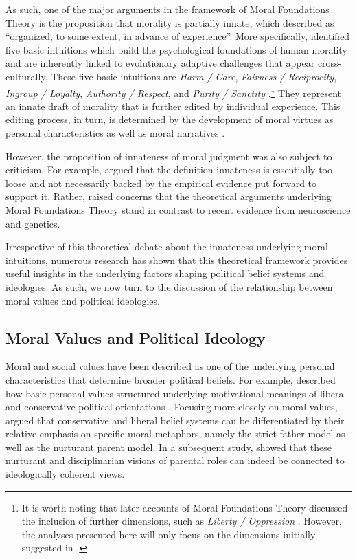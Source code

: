 \documentclass[12pt]{article}
\begin{document}
As such, one of the major arguments in the framework of Moral Foundations Theory is the proposition that morality is partially innate, which \citet[367]{haidt2008moral} described as ``organized, to some extent, in advance of experience''. More specifically, \citet{haidt2008moral} identified five basic intuitions which build the psychological foundations of human morality and are inherently linked to evolutionary adaptive challenges that appear cross-culturally. These five basic intuitions are \textit{Harm / Care}, \textit{Fairness / Reciprocity}, \textit{Ingroup / Loyalty}, \textit{Authority / Respect}, and \textit{Purity / Sanctity} \citep[see also][]{graham2011mapping}.\footnote{It is worth noting that later accounts of Moral Foundations Theory discussed the inclusion of further dimensions, such as \textit{Liberty / Oppression} \citep[c.f.][]{graham2013moral,haidt2012righteous}. However, the analyses presented here will only focus on the dimensions initially suggested in \citet{haidt2008moral}.} They represent an innate draft of morality that is further edited by individual experience. This editing process, in turn, is determined by the development of moral virtues as personal characteristics as well as moral narratives \citep{haidt2008moral}.

However, the proposition of innateness of moral judgment was also subject to criticism. For example, \citet{suhler2011can} argued that the definition innateness is essentially too loose and not necessarily backed by the empirical evidence put forward to support it. Rather, \citet{suhler2011can} raised concerns that the theoretical arguments underlying Moral Foundations Theory stand in contrast to recent evidence from neuroscience and genetics.

Irrespective of this theoretical debate about the innateness underlying moral intuitions, numerous research has shown that this theoretical framework provides useful insights in the underlying factors shaping political belief systems and ideologies. As such, we now turn to the discussion of the relationship between moral values and political ideologies.


\subsection{Moral Values and Political Ideology}

Moral and social values have been described as one of the underlying personal characteristics that determine broader political beliefs. For example, \citet{piurko2011basic} described how basic personal values structured underlying motivational meanings of liberal and conservative political orientations \citep[see also][]{schwartz2010basic,schwartz2011basic}. Focusing more closely on moral values, \citet{lakoff1995metaphor} argued that conservative and liberal belief systems can be differentiated by their relative emphasis on specific moral metaphors, namely the strict father model as well as the nurturant parent model. In a subsequent study, \citet{barker2006competing} showed that these nurturant and disciplinarian visions of parental roles can indeed be connected to ideologically coherent views.
\end{document}

